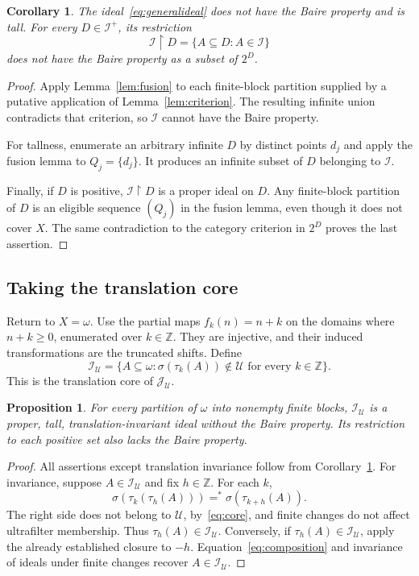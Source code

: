 \documentclass[11pt,a4paper]{article}
\newtheorem{proposition}[theorem]{Proposition}
\newtheorem{corollary}[theorem]{Corollary}
\theoremstyle{definition}
\theoremstyle{remark}
\newcommand{\I}{\mathcal I}
\newcommand{\J}{\mathcal J}
\newcommand{\U}{\mathcal U}
\newcommand{\supp}{\sigma}
\newcommand{\sh}[2]{\tau_{#1}(#2)}
\newcommand{\eqfin}{=^{*}}
\newcommand{\restr}{\mathbin{\upharpoonright}}
\begin{document}
\begin{corollary}
\label{cor:nonbp}
The ideal~\eqref{eq:generalideal} does not have the Baire property and
is tall. For every $D\in\I^+$, its restriction
\[
                 \I\restr D=\{A\subseteq D:A\in\I\}
\]
does not have the Baire property as a subset of $2^D$.
\end{corollary}
\begin{proof}
Apply Lemma~\ref{lem:fusion} to each finite-block partition supplied by
a putative application of Lemma~\ref{lem:criterion}. The resulting
infinite union contradicts that criterion, so $\I$ cannot have the
Baire property.

For tallness, enumerate an arbitrary infinite $D$ by distinct points
$d_j$ and apply the fusion lemma to $Q_j=\{d_j\}$. It produces an
infinite subset of $D$ belonging to $\I$.

Finally, if $D$ is positive, $\I\restr D$ is a proper ideal on $D$.
Any finite-block partition of $D$ is an eligible sequence $(Q_j)$ in the
fusion lemma, even though it does not cover $X$. The same contradiction
to the category criterion in $2^D$ proves the last assertion.
\end{proof}

\subsection{Taking the translation core}
Return to $X=\omega$. Use the partial maps $f_k(n)=n+k$ on the domains
where $n+k\ge0$, enumerated over $k\in\mathbb Z$. They are injective,
and their induced transformations are the truncated shifts.
Define
\begin{equation}
\label{eq:core}
 \boxed{\displaystyle
 \I_\U=\{A\subseteq\omega:
          \supp(\sh{k}{A})\notin\U\text{ for every }k\in\mathbb Z\}.}
\end{equation}
This is the translation core of $\J_\U$.

\begin{proposition}
\label{prop:core}
For every partition of $\omega$ into nonempty finite blocks,
$\I_\U$ is a proper, tall, translation-invariant ideal without the
Baire property. Its restriction to each positive set also lacks the
Baire property.
\end{proposition}
\begin{proof}
All assertions except translation invariance follow from
Corollary~\ref{cor:nonbp}. For invariance, suppose $A\in\I_\U$ and fix
$h\in\mathbb Z$. For each $k$,
\[
       \supp(\sh{k}{\sh{h}{A}})
                   \eqfin\supp(\sh{k+h}{A}).
\]
The right side does not belong to $\U$, by~\eqref{eq:core}, and finite
changes do not affect ultrafilter membership. Thus
$\sh{h}{A}\in\I_\U$. Conversely, if $\sh{h}{A}\in\I_\U$, apply the
already established closure to $-h$. Equation~\eqref{eq:composition}
and invariance of ideals under finite changes recover $A\in\I_\U$.
\end{proof}
\end{document}
